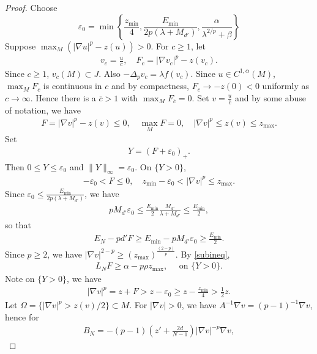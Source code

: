 \documentclass[11pt]{amsart}
\def \eps {\varepsilon}
\theoremstyle{definition}
\begin{document}
\begin{proof}
Choose
\begin{equation*}
    \eps_0 = \min\left\{ \frac{z_{\min}}{4},\frac{E_{\min}}{2p(\lambda+M_{d'})}, \frac{\alpha}{\lambda^{2/p}+\beta}\right\}
\end{equation*}
Suppose $\displaystyle \max_M(|\nabla u|^p-z(u))>0$.   For $c\geq 1$, let
\begin{align*}
    v_c=\frac{u}{c}, \quad F_c=|\nabla v_c|^p-z(v_c).
\end{align*}
Since $c\geq 1$, $v_c(M)\subset J$.   Also $-\Delta_pv_c=\lambda f(v_c)$.  Since $u\in C^{1,\alpha}(M)$, $\displaystyle \max_M F_c$ is continuous in $c$ and by compactness, $F_c\to -z(0)<0$ uniformly as $c\to \infty$.  Hence there is a $\bar{c}>1$ with $\max_M F_{\bar{c}}=0$.  Set $v=\frac{u}{\bar{c}}$ and by some abuse of notation, we have
\begin{align*}
    F=|\nabla v|^p-z(v)\leq 0, \quad \max_M F=0, \quad |\nabla v|^p\leq z(v)\leq z_{\max}.
\end{align*}
Set
\begin{align*}
    Y=(F+\eps_0)_+.
\end{align*}
Then $0\leq Y \leq \eps_0$ and $\|Y\|_\infty = \eps_0$.  On $\{Y>0\}$, 
\begin{align*}
    -\eps_0 < F \leq 0, \quad z_{\min}-\eps_0<|\nabla v|^p \leq z_{\max}.
\end{align*}
Since $\eps_0\leq \frac{E_{\min}}{2p(\lambda+M_{d'})}$,
we have
\begin{align*}
    pM_{d'}\eps_0 \leq \frac{E_{\min}}{2}\frac{M_{d'}}{\lambda+M_{d'}}\leq \frac{E_{\min}}{2},
\end{align*}
so that
\begin{align*}
    E_N-pd'F\geq E_{\min}-pM_{d'}\eps_0\geq \frac{E_{\min}}{2}.
\end{align*}
Since $p\geq 2$, we have $|\nabla v|^{2-p}\geq(z_{\max})^{\frac{(2-p)}{p}}.$
By \eqref{subineq}, 
\begin{align*}
    L_NF \geq \alpha-p\rho z_{\max},\quad \text{ on }\{Y>0\}.
\end{align*}
Note on $\{Y>0\}$, we have
\begin{align*}
    |\nabla v|^p=z+F>z-\eps_0\geq z-\frac{z_{\min}}{4}>\frac{1}{2}z.
\end{align*}
Let $\Omega=\{|\nabla v|^p > z(v)/2\}\subset M$. For $|\nabla v|>0$, we have $A^{-1}\nabla v=(p-1)^{-1}\nabla v$, hence for
\begin{align*}
    B_N=-(p-1)\left(z'+\frac{2d}{N-1}\right)|\nabla v|^{-p}\nabla v,
\end{align*}


\end{proof}
\end{document}

